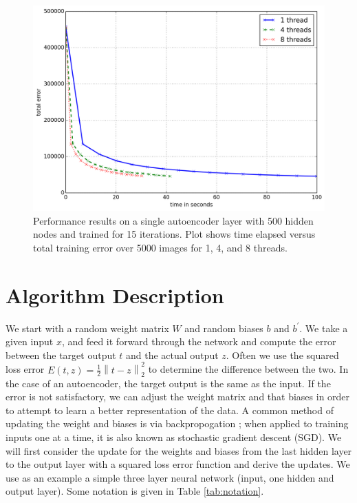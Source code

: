 \documentclass[conference]{IEEEtran}
\newcommand{\norm}[1]{\left\lVert #1 \right\rVert}
\begin{document}
\begin{figure}[h]
\centering
\includegraphics[width=1.0\linewidth]{experiment1.png}
\caption{Performance results on a single autoencoder layer with 500 hidden nodes and trained for 15 iterations. Plot shows time elapsed versus total training error over 5000 images for 1, 4, and 8 threads.}
\label{fig:experiment1}
\end{figure}

\section{Algorithm Description}
We start with a random weight matrix $W$ and random biases $b$ and $b^{'}$. We take a given input $x$, and feed it forward through the network and compute the error between the target output $t$ and the actual output $z$. Often we use the squared loss error $E(t,z) = \frac{1}{2}\norm{t-z}_2^2$ to determine the difference between the two. In the case of an autoencoder, the target output is the same as the input. If the error is not satisfactory, we can adjust the weight matrix and that biases in order to attempt to learn a better representation of the data. A common method of updating the weight and biases is via backpropogation \cite{hecht1989theory}; when applied to training inputs one at a time, it is also known as stochastic gradient descent (SGD). We will first consider the update for the weights and biases from the last hidden layer to the output layer with a squared loss error function and derive the updates. We use as an example a simple three layer neural network (input, one hidden and output layer). Some notation is given in Table \ref{tab:notation}.
\end{document}
